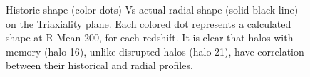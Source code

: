 \begin{figure}[!ht]
  \centering
  \hfill
  \caption{Historic shape (color dots) Vs actual radial shape (solid black line) on the Triaxiality plane. Each colored dot represents a calculated shape at R Mean 200, for each redshift. It is clear that halos with memory (halo 16), unlike disrupted halos (halo 21), have correlation between their historical and radial profiles.}
  \label{fig:RedshiftDM}
\end{figure}







 
